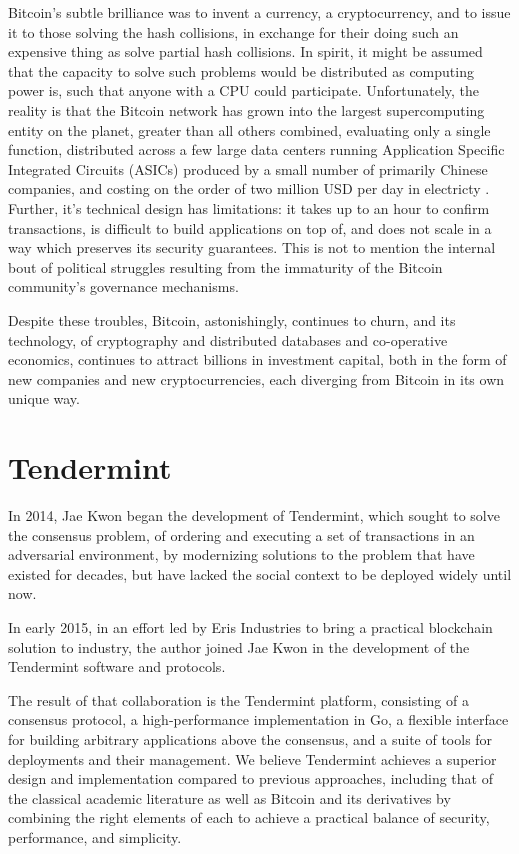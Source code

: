 Bitcoin's subtle brilliance was to invent a currency, a cryptocurrency, and to issue it to those solving the hash collisions, 
in exchange for their doing such an expensive thing as solve partial hash collisions.
In spirit, it might be assumed that the capacity to solve such problems would be distributed as computing power is, 
such that anyone with a CPU could participate.
Unfortunately, the reality is that the Bitcoin network has grown into the largest supercomputing entity on the planet, greater than all others combined,
evaluating only a single function, distributed across a few large data centers running Application Specific Integrated Circuits (ASICs) 
produced by a small number of primarily Chinese companies, 
and costing on the order of two million USD per day in electricty \cite{blockchaininfo}.
Further, it's technical design has limitations: it takes up to an hour to confirm transactions, is difficult to build applications on top of, and does not scale in a way which preserves its security guarantees.
This is not to mention the internal bout of political struggles resulting from the immaturity of the Bitcoin community's governance mechanisms.

Despite these troubles, Bitcoin, astonishingly, continues to churn,
and its technology, 
of cryptography and distributed databases and co-operative economics,
continues to attract billions in investment capital,
both in the form of new companies and new cryptocurrencies,
each diverging from Bitcoin in its own unique way.

\section{Tendermint}

In 2014, Jae Kwon began the development of Tendermint, which sought to solve the consensus problem,
of ordering and executing a set of transactions in an adversarial environment, 
by modernizing solutions to the problem that have existed for decades,
but have lacked the social context to be deployed widely until now.

In early 2015, in an effort led by Eris Industries to bring a practical blockchain solution to industry,
the author joined Jae Kwon in the development of the Tendermint software and protocols.

The result of that collaboration is the Tendermint platform, consisting of a consensus protocol, a high-performance implementation in Go,
a flexible interface for building arbitrary applications above the consensus, and a suite of tools for deployments and their management.
We believe Tendermint achieves a superior design and implementation compared to previous approaches, 
including that of the classical academic literature \cite{dls,pbft,raft} as well as Bitcoin \cite{bitcoin} and its derivatives \cite{ethereum,sidechains,peercoin}
by combining the right elements of each to achieve a practical balance of security, performance, and simplicity.

